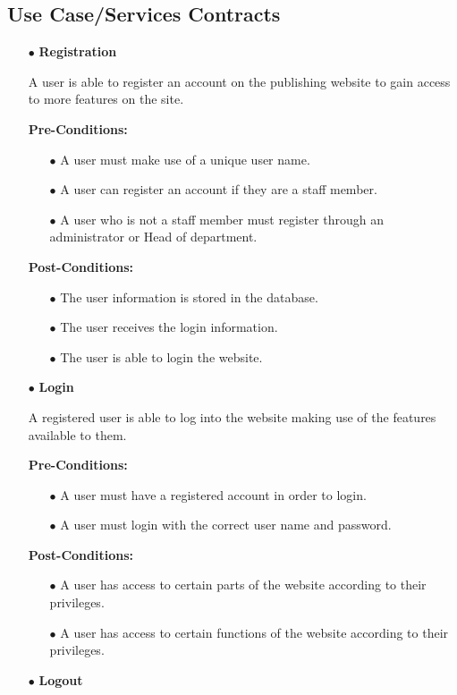 \documentclass[a4paper,12pt]{article}
\begin{document}
\subsection{Use Case/Services Contracts}
\begin{itemize}
	\item[$\bullet$]\textbf{Registration}

	A user is able to register an account on the publishing website to gain access to more features on the site.

	\textbf{Pre-Conditions:}
	\begin{itemize}
		\item[$\bullet$]A user must make use of a unique user name.
		\item[$\bullet$]A user can register an account if they are a staff member.
		\item[$\bullet$]A user who is not a staff member must register through an administrator or Head of department.
		\\
	\end{itemize}
	\textbf{Post-Conditions: }
	\begin{itemize}
		\item[$\bullet$]The user information is stored in the database.
		\item[$\bullet$]The user receives the login information.
		\item[$\bullet$]The user is able to login the website.
		\\
	\end{itemize}
	\item[$\bullet$]\textbf{Login}

	A registered user is able to log into the website making use of the features available to them.
	
	\textbf{Pre-Conditions:}
	\begin{itemize}
		\item[$\bullet$]A user must have a registered account in order to login.
		\item[$\bullet$]A user must login with the correct user name and password.
		\\
	\end{itemize}
	\textbf{Post-Conditions: }
	\begin{itemize}
		\item[$\bullet$]A user has access to certain parts of the website according to their privileges.
		\item[$\bullet$]A user has access to certain functions of the website according to their privileges.
		\\
	\end{itemize}
	\item[$\bullet$]\textbf{Logout}


\end{itemize}
\end{document}
